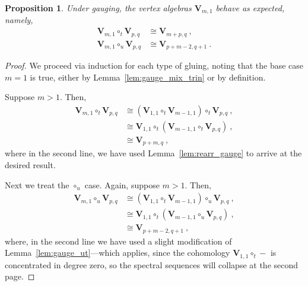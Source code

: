 \documentclass[a4paper]{article}
\newtheorem{prop}[thm]{Proposition}
\def\V{\mathbf{V}}
\begin{document}
\begin{prop}\label{prop:gauge_mix}
Under gauging, the vertex algebras $\V_{m,1}$ behave as expected, namely,
\begin{equation}\nonumber
	\begin{split}
	\V_{m,1}\circ_t \V_{p,q}&\cong \V_{m+p,q}~,\\
	\V_{m,1}\circ_u\V_{p,q}&\cong \V_{p+m-2,q+1}~.
	\end{split}
\end{equation}
\end{prop}
\begin{proof}
We proceed via induction for each type of gluing, noting that the base case $m=1$ is true, either by Lemma~\ref{lem:gauge_mix_trin} or by definition.

Suppose $m>1$. Then,
\begin{equation}\nonumber
	\begin{split}
	\V_{m,1}\circ_t\V_{p,q} &\cong (\V_{1,1}\circ_t\V_{m-1,1})\circ_t\V_{p,q}~,\\
	&\cong \V_{1,1}\circ_t(\V_{m-1,1}\circ_t\V_{p,q})~,\\
	&\cong \V_{p+m,q}~,
	\end{split}
\end{equation}
where in the second line, we have used Lemma~\ref{lem:rearr_gauge} to arrive at the desired result.

Next we treat the $\circ_u$ case. Again, suppose $m>1$. Then,
\begin{equation}\nonumber
	\begin{split}
	\V_{m,1}\circ_u\V_{p,q} &\cong (\V_{1,1}\circ_t\V_{m-1,1})\circ_u\V_{p,q}~,\\
	&\cong \V_{1,1}\circ_t(\V_{m-1,1}\circ_u\V_{p,q})~,\\
	&\cong \V_{p+m-2,q+1}~,
	\end{split}
\end{equation}
where, in the second line we have used a slight modification of Lemma~\ref{lem:gauge_ut}---which applies, since the cohomology $\V_{1,1}\circ_t-$ is concentrated in degree zero, so the spectral sequences will collapse at the second page.
\end{proof}
\end{document}
